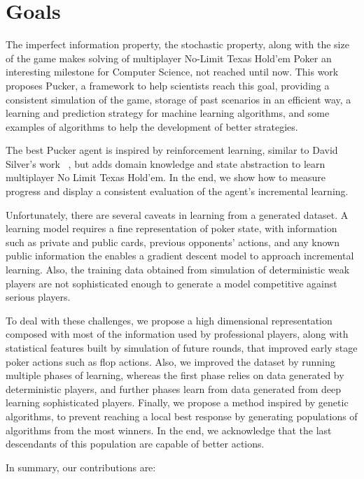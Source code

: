 \section{Goals}
\label{sec:goals}

The imperfect information property, the stochastic property, along with the size of the game makes solving of multiplayer No-Limit Texas Hold’em Poker an interesting milestone for Computer Science, not reached until now. This work proposes Pucker, a framework to help scientists reach this goal, providing a consistent simulation of the game, storage of past scenarios in an efficient way, a learning  and prediction strategy for machine learning algorithms, and some examples of algorithms to help the development of better strategies.

The best Pucker agent is inspired by reinforcement learning, similar to David Silver's work ~\cite{Silver2016}, but adds domain knowledge and state abstraction to learn multiplayer No Limit Texas Hold'em. In the end, we show how to measure progress and display a consistent evaluation of the agent's incremental learning.

Unfortunately, there are several caveats in learning from a generated dataset. A learning model requires a fine representation of poker state, with information such as private and public cards, previous opponents' actions, and any known public information the enables a gradient descent model to approach incremental learning. Also, the training data obtained from simulation of deterministic weak players are not sophisticated enough to generate a model competitive against serious players.

To deal with these challenges, we propose a high dimensional representation composed with most of the information used by professional players, along with statistical features built by simulation of future rounds, that improved early stage poker actions such as flop actions. Also, we improved the dataset by running multiple phases of learning, whereas the first phase relies on data generated by deterministic players, and further phases learn from data generated from deep learning sophisticated players. Finally, we propose a method inspired by genetic algorithms, to prevent reaching a local best response by generating populations of algorithms from the most winners. In the end, we acknowledge that the last descendants of this population are capable of better actions.

In summary,  our contributions are:

